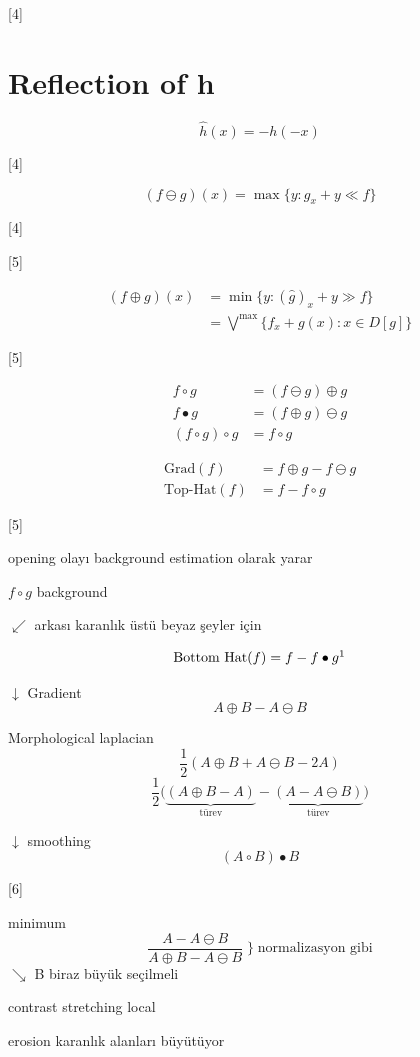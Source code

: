 \documentclass[11pt,a4paper]{article}
\begin{document}
[4]

\section{Reflection of h}
\[ \hat{h}(x) = -h(-x) \]

[4]

\[ (f \ominus g)(x) = \max\{y : g_x + y \ll f\} \]

[4]

[5]

\begin{align*}
(f \oplus g)(x) &= \min\{y : (\hat{g})_x + y \gg f\}\\
&= \overset{\text{max}}{\bigvee}\{f_x + g(x) : x \in D[g]\}
\end{align*}

[5]

\begin{align*}
f \circ g &= (f \ominus g) \oplus g\\
f \bullet g &= (f \oplus g) \ominus g\\
(f \circ g) \circ g &= f \circ g
\end{align*}

\begin{align*}
\text{Grad}(f) &= f \oplus g - f \ominus g\\
\text{Top-Hat}(f) &= f - f \circ g
\end{align*}

[5]

opening olayı background estimation olarak yarar

$f \circ g$ background

$\swarrow$ arkası karanlık üstü beyaz şeyler için


\[ \text{Bottom Hat}(f) = f - f \bullet g\footnotemark \]

$\downarrow$ Gradient
\[ A \oplus B - A \ominus B \]

Morphological laplacian
\[ \frac{1}{2}(A \oplus B + A \ominus B - 2A) \]
\[ \frac{1}{2}\Big(\underbrace{(A \oplus B - A)}_{\text{türev}} - \underbrace{(A - A \ominus B)}_{\text{türev}}\Big) \]

$\downarrow$ smoothing
\[ (A \circ B) \bullet B \]

[6]

minimum
\[ \frac{A - A \ominus B}{A \oplus B - A \ominus B} \;\Big\}\; \text{normalizasyon gibi} \]
$\searrow$ B biraz büyük seçilmeli

contrast stretching local

erosion karanlık alanları büyütüyor

\end{document}
